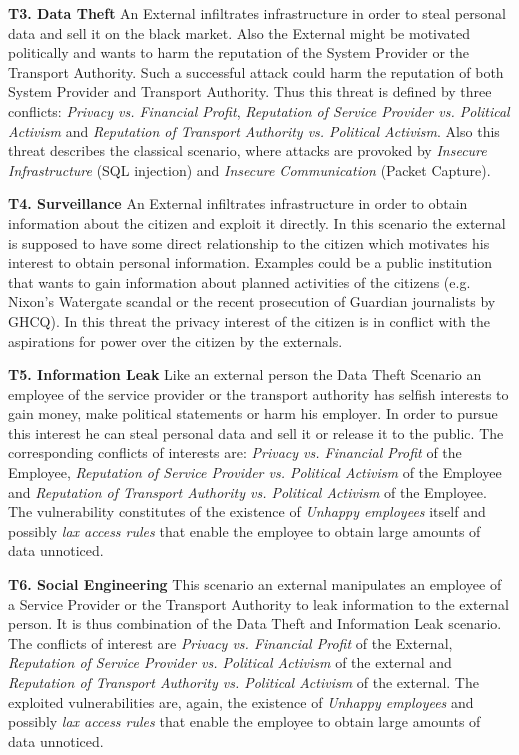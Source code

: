 \documentclass[runningheads,a4paper]{llncs}
\begin{document}
\textbf{T3. Data Theft}
An External infiltrates infrastructure in order to steal personal data and sell it on the black market. Also the External might be motivated politically and wants to harm the reputation of the System Provider or the Transport Authority. Such a successful attack could harm the reputation of both System Provider and Transport Authority. Thus this threat is defined by three conflicts: \textit{Privacy vs. Financial Profit}, \textit{Reputation of Service Provider vs. Political Activism} and \textit{Reputation of Transport Authority vs. Political Activism}. Also this threat describes the classical scenario, where attacks are provoked by \textit{Insecure Infrastructure} (SQL injection) and \textit{Insecure Communication} (Packet Capture).

\textbf{T4. Surveillance}
An External infiltrates infrastructure in order to obtain information
about the citizen and exploit it directly.  In this scenario the
external is supposed to have some direct relationship to the citizen
which motivates his interest to obtain personal information.  Examples
could be a public institution that wants to gain information about
planned activities of the citizens (e.g. Nixon's Watergate scandal or
the recent prosecution of Guardian journalists by GHCQ). 
In this threat the privacy interest of the citizen is in conflict with
the aspirations for power over the citizen by the externals.

\textbf{T5. Information Leak} 
Like an external person the Data Theft Scenario an employee of the
service provider or the transport authority has selfish interests to gain
money, make political statements or harm his employer.  In order to
pursue this interest he can steal personal data and sell it or release
it to the public.  The corresponding conflicts of interests are:
\textit{Privacy vs. Financial Profit} of the Employee, \textit{Reputation of Service
  Provider vs. Political Activism} of the Employee and \textit{Reputation of Transport
  Authority vs. Political Activism} of the Employee.  The vulnerability constitutes of
the existence of \textit{Unhappy employees} itself and possibly \textit{lax access
rules} that enable the employee to obtain large amounts of data
unnoticed.

\textbf{T6. Social Engineering}
This scenario an external manipulates an employee of a Service
Provider or the Transport Authority to leak information to the external
person.  It is thus combination of the Data Theft and Information Leak
scenario.
The conflicts of interest are \textit{Privacy vs. Financial Profit} of
the External, \textit{Reputation of Service Provider vs. Political
  Activism} of the external and \textit{Reputation of Transport Authority
  vs. Political Activism} of the external.  The exploited
vulnerabilities are, again, the existence of \textit{Unhappy
  employees} and possibly \textit{lax access rules} that enable the
employee to obtain large amounts of data unnoticed.
\end{document}
